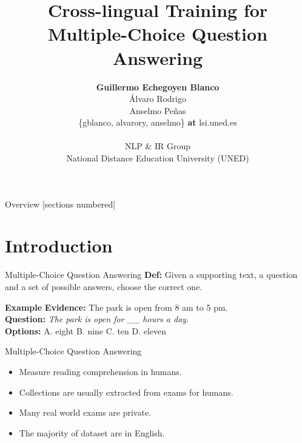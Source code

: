 \documentclass[]{beamer}
\title{Cross-lingual Training for\\Multiple-Choice Question Answering}
\author{\textbf{Guillermo Echegoyen Blanco} \\ \'Alvaro Rodrigo \\ Anselmo Pe\~nas \\ 
    \{gblanco, alvarory, anselmo\} \textbf{at} lsi.uned.es \\ \\
    NLP \& IR Group \\
    National Distance Education University (UNED)}
\date{}
\def\mAlertSpace{\vspace{0.5em}}
\begin{document}
\maketitle

\begin{frame}{Overview}
  [sections numbered]
  \tableofcontents[hideallsubsections]
\end{frame}

\section{Introduction}
  \begin{frame}{\secname}
    \begin{alertblock}{Multiple-Choice Question Answering}
      \mAlertSpace
      \textbf{Def:} Given a supporting text, a question and a set of possible answers, choose the correct one. 
      \mAlertSpace
      \begin{block}{{\color{mLightGreen}\textbf{Example}} }
        \mAlertSpace
        \textbf{Evidence:} The park is open from 8 am to 5 pm. \\
        \textbf{Question:} \textit{The park is open for \_\_ hours a day.} \\
        \textbf{Options:} A. eight B. {\color{mLightGreen} nine} C. ten D. eleven
      \end{block}
    \end{alertblock}
  \end{frame}
  \begin{frame}{\secname}
    \begin{alertblock}{Multiple-Choice Question Answering}
      \mAlertSpace
      \begin{itemize}
        \item Measure reading comprehension in humans.
        \item Collections are usually extracted from exams for humans.
        \item Many real world exams are private.
        \item The majority of dataset are in English.
    \end{itemize}
    \end{alertblock}
  \end{frame}

\end{document}
